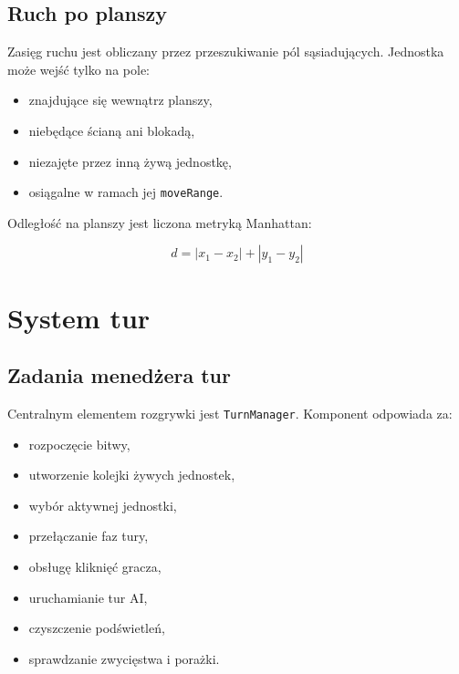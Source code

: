 \documentclass[12pt,a4paper]{article}
\begin{document}
\subsection{Ruch po planszy}

Zasięg ruchu jest obliczany przez przeszukiwanie pól sąsiadujących. Jednostka może wejść tylko na pole:

\begin{itemize}
    \item znajdujące się wewnątrz planszy,
    \item niebędące ścianą ani blokadą,
    \item niezajęte przez inną żywą jednostkę,
    \item osiągalne w ramach jej \texttt{moveRange}.
\end{itemize}

Odległość na planszy jest liczona metryką Manhattan:

\begin{equation}
    d = |x_1 - x_2| + |y_1 - y_2|
\end{equation}

\newpage

\section{System tur}

\subsection{Zadania menedżera tur}

Centralnym elementem rozgrywki jest \texttt{TurnManager}. Komponent odpowiada za:

\begin{itemize}
    \item rozpoczęcie bitwy,
    \item utworzenie kolejki żywych jednostek,
    \item wybór aktywnej jednostki,
    \item przełączanie faz tury,
    \item obsługę kliknięć gracza,
    \item uruchamianie tur AI,
    \item czyszczenie podświetleń,
    \item sprawdzanie zwycięstwa i porażki.
\end{itemize}
\end{document}
